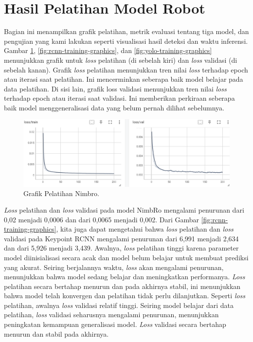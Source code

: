 \section{Hasil Pelatihan Model Robot}
\label{sec:robotmodeltrainingresult}

Bagian ini menampilkan grafik pelatihan, metrik evaluasi tentang tiga model, dan pengujian yang kami lakukan seperti visualisasi hasil deteksi dan waktu inferensi.
Gambar \ref{fig:nimbro-training-graphics}, \ref{fig:rcnn-training-graphics}, dan \ref{fig:yolo-training-graphics} menunjukkan grafik untuk \textit{loss} pelatihan (di sebelah kiri) dan \textit{loss} validasi (di sebelah kanan).
Grafik \textit{loss} pelatihan menunjukkan tren nilai \textit{loss} terhadap epoch atau iterasi saat pelatihan. Ini mencerminkan seberapa baik model belajar pada data pelatihan.
Di sisi lain, grafik loss validasi menunjukkan tren nilai \textit{loss} terhadap epoch atau iterasi saat validasi. Ini memberikan perkiraan seberapa baik model menggeneralisasi data yang belum pernah dilihat sebelumnya.
\begin{figure}[ht]
  \centering
  \includegraphics[scale=0.65]{gambar/loss-nimbro.png}
  \caption{Grafik Pelatihan Nimbro.}
  \label{fig:nimbro-training-graphics}
\end{figure}
\textit{Loss} pelatihan dan \textit{loss} validasi pada model NimbRo mengalami penurunan dari 0,02 menjadi 0,0006 dan dari 0,0065 menjadi 0,002. Dari Gambar \ref{fig:rcnn-training-graphics}, kita juga dapat mengetahui bahwa \textit{loss} pelatihan dan \textit{loss} validasi pada Keypoint RCNN mengalami penurunan dari 6,991 menjadi 2,634 dan dari 5,926 menjadi 3,439.
Awalnya, \textit{loss} pelatihan tinggi karena parameter model diinisialisasi secara acak dan model belum belajar untuk membuat prediksi yang akurat. Seiring berjalannya waktu, \textit{loss} akan mengalami penurunan, menunjukkan bahwa model sedang belajar dan meningkatkan performanya.
\textit{Loss} pelatihan secara bertahap menurun dan pada akhirnya stabil, ini menunjukkan bahwa model telah konvergen dan pelatihan tidak perlu dilanjutkan.
Seperti \textit{loss} pelatihan, awalnya \textit{loss} validasi relatif tinggi. Seiring model belajar dari data pelatihan, \textit{loss} validasi seharusnya mengalami penurunan, menunjukkan peningkatan kemampuan generalisasi model. \textit{Loss} validasi secara bertahap menurun dan stabil pada akhirnya.

